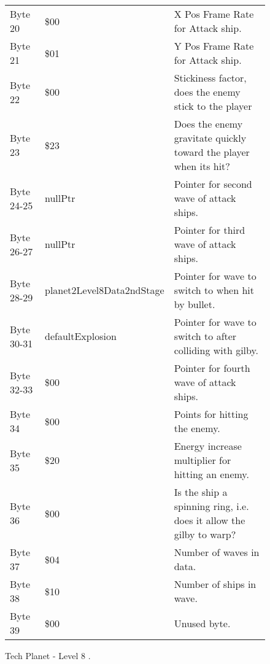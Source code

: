 \begin{figure}[H]
{\begin{adjustbox}{width=12cm}
\begin{tabular}{lll}
 Byte 20    & \$00                       & X Pos Frame Rate for Attack ship.                                   \\
 Byte 21    & \$01                       & Y Pos Frame Rate for Attack ship.                                   \\
 Byte 22    & \$00                       & Stickiness factor, does the enemy stick to the player               \\
 Byte 23    & \$23                       & Does the enemy gravitate quickly toward the player when its hit?    \\
 Byte 24-25 & nullPtr                   & Pointer for second wave of attack ships.                            \\
 Byte 26-27 & nullPtr                   & Pointer for third wave of attack ships.                             \\
 Byte 28-29 & planet2Level8Data2ndStage & Pointer for wave to switch to when hit by bullet.                   \\
 Byte 30-31 & defaultExplosion          & Pointer for  wave to switch to after colliding with gilby.          \\
 Byte 32-33 & \$00                       & Pointer for fourth wave of attack ships.                            \\
 Byte 34    & \$00                       & Points for hitting the enemy.                                       \\
 Byte 35    & \$20                       & Energy increase multiplier for hitting an enemy.                    \\
 Byte 36    & \$00                       & Is the ship a spinning ring, i.e. does it allow the gilby to warp?  \\
 Byte 37    & \$04                       & Number of waves in data.                                            \\
 Byte 38    & \$10                       & Number of ships in wave.                                            \\
 Byte 39    & \$00                       & Unused byte.                                                        \\
\bottomrule
\end{tabular}

  \end{adjustbox}

  }\caption*{Tech Planet - Level 8
.}
\end{figure}

